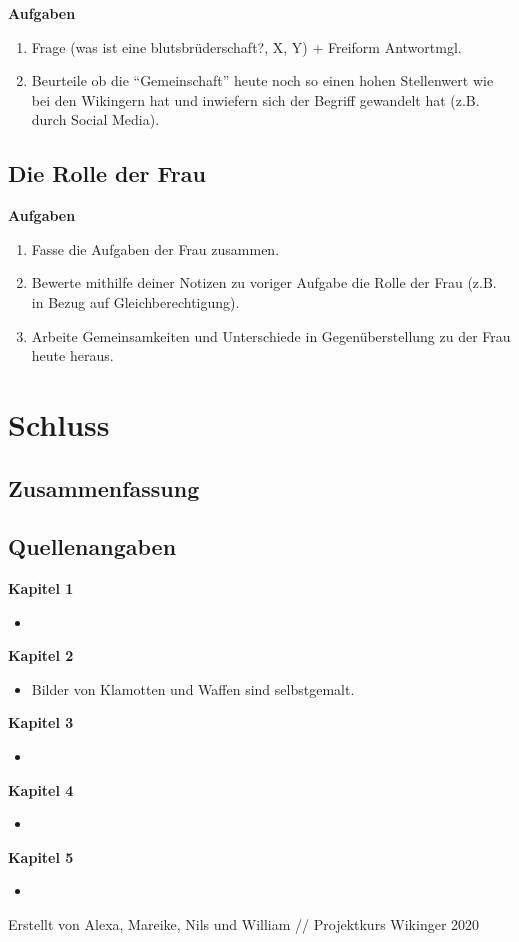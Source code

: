 \documentclass[12pt,a4paper,ngerman,openany]{book}
\newcommand\blankpage{\null \thispagestyle{empty} \addtocounter{page}{-1} \newpage}
\newcommand{\aufgaben}[1]{
  \begin{tcolorbox}
    \textbf{Aufgaben}
    \begin{enumerate}
      #1
    \end{enumerate}
  \end{tcolorbox}
} %
\newcommand{\fchapter}[1]{\chapter{#1}\thispagestyle{chapterstyle}}
\begin{document}
\aufgaben{
  \item Frage (was ist eine blutsbrüderschaft?, X, Y) + Freiform Antwortmgl.
  \item Beurteile ob die “Gemeinschaft” heute noch so einen hohen Stellenwert wie bei den Wikingern hat und inwiefern sich der Begriff gewandelt hat (z.B. durch Social Media).
}

\section{Die Rolle der Frau}

\aufgaben{
  \item Fasse die Aufgaben der Frau zusammen.
  \item Bewerte mithilfe deiner Notizen zu voriger Aufgabe die Rolle der Frau (z.B. in Bezug auf Gleichberechtigung).
  \item Arbeite Gemeinsamkeiten und Unterschiede in Gegenüberstellung zu der Frau heute heraus.
}

\fchapter{Schluss}

\section{Zusammenfassung}

\newpage %
\section{Quellenangaben}


\textbf{Kapitel 1}
\begin{itemize}
  \item 
\end{itemize}

\textbf{Kapitel 2}
\begin{itemize}
  \item Bilder von Klamotten und Waffen sind selbstgemalt.
\end{itemize}

\textbf{Kapitel 3}
\begin{itemize}
  \item 
\end{itemize}

\textbf{Kapitel 4}
\begin{itemize}
  \item 
\end{itemize}

\textbf{Kapitel 5}
\begin{itemize}
  \item 
\end{itemize}


\afterpage{\blankpage}
\afterpage{\blankpage}
\afterpage{\blankpage}
\afterpage{\blankpage}
\afterpage{\blankpage}

\newpage
\vspace*{24cm} Erstellt von Alexa, Mareike, Nils und William // Projektkurs Wikinger 2020
\thispagestyle{empty}
\newpage

\thispagestyle{empty}
\end{document}
